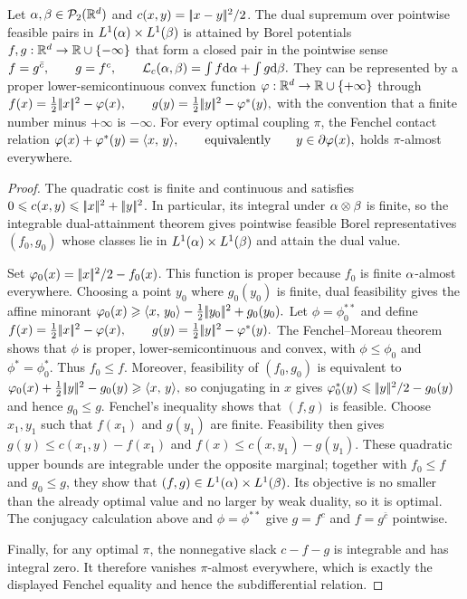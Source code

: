 \begin{prop}\label{prop-quadratic-dual-attainment}
Let $\alpha,\beta\in\mathcal{P}_2(\mathbb{R}^d)$ and $c(x,y)=|\!| x-y |\!|^2/2$. The dual supremum over pointwise feasible pairs in $L^1(\alpha)\times L^1(\beta)$ is attained by Borel potentials $f,g:\mathbb{R}^d\to\mathbb{R}\cup\{-\infty\}$ that form a closed pair in the pointwise sense
\(f=g^{\bar c}, \qquad g=f^c, \qquad \mathcal{L}_c(\alpha,\beta)=\int f\mathrm{d}\alpha+\int g\mathrm{d}\beta.\)
They can be represented by a proper lower-semicontinuous convex function $\varphi:\mathbb{R}^d\to\mathbb{R}\cup\{+\infty\}$ through
\(f(x)=\frac12|\!| x |\!|^2-\varphi(x), \qquad g(y)=\frac12|\!| y |\!|^2-\varphi^*(y),\)
with the convention that a finite number minus $+\infty$ is $-\infty$.
For every optimal coupling $\pi$, the Fenchel contact relation
\(\varphi(x)+\varphi^*(y)=\langle x,\,y\rangle, \qquad\text{equivalently}\qquad y\in\partial\varphi(x),\)
holds $\pi$-almost everywhere.
\end{prop}
\begin{proof}
The quadratic cost is finite and continuous and satisfies $0\leqslant c(x,y)\leqslant|\!| x |\!|^2+|\!| y |\!|^2$. In particular, its integral under $\alpha\otimes\beta$ is finite, so the integrable dual-attainment theorem gives pointwise feasible Borel representatives $(f_0,g_0)$ whose classes lie in $L^1(\alpha)\times L^1(\beta)$ and attain the dual value.

Set $\varphi_0(x)=|\!| x |\!|^2/2-f_0(x)$. This function is proper because $f_0$ is finite $\alpha$-almost everywhere. Choosing a point $y_0$ where $g_0(y_0)$ is finite, dual feasibility gives the affine minorant
\(\varphi_0(x)\geqslant \langle x,\,y_0\rangle-\frac12|\!| y_0 |\!|^2+g_0(y_0).\)
Let $\phi=\phi_0^{**}$ and define
\(f(x)=\frac12|\!| x |\!|^2-\varphi(x), \qquad g(y)=\frac12|\!| y |\!|^2-\varphi^*(y).\)
The Fenchel--Moreau theorem shows that $\phi$ is proper, lower-semicontinuous and convex, with $\phi\leq\phi_0$ and $\phi^*=\phi_0^*$. Thus $f_0\leq f$. Moreover, feasibility of $(f_0,g_0)$ is equivalent to
\(\varphi_0(x)+\frac12|\!| y |\!|^2-g_0(y)\geqslant\langle x,\,y\rangle,\)
so conjugating in $x$ gives $\varphi_0^*(y)\leqslant|\!| y |\!|^2/2-g_0(y)$ and hence $g_0\leq g$. Fenchel's inequality shows that $(f,g)$ is feasible. Choose $x_1,y_1$ such that $f(x_1)$ and $g(y_1)$ are finite. Feasibility then gives
$g(y)\leq c(x_1,y)-f(x_1)$ and $f(x)\leq c(x,y_1)-g(y_1)$. These quadratic upper bounds are integrable under the opposite marginal; together with $f_0\leq f$ and $g_0\leq g$, they show that $(f,g)\in L^1(\alpha)\times L^1(\beta)$. Its objective is no smaller than the already optimal value and no larger by weak duality, so it is optimal. The conjugacy calculation above and $\phi=\phi^{**}$ give $g=f^c$ and $f=g^{\bar c}$ pointwise.

Finally, for any optimal $\pi$, the nonnegative slack $c-f-g$ is integrable and has integral zero. It therefore vanishes $\pi$-almost everywhere, which is exactly the displayed Fenchel equality and hence the subdifferential relation.
\end{proof}
